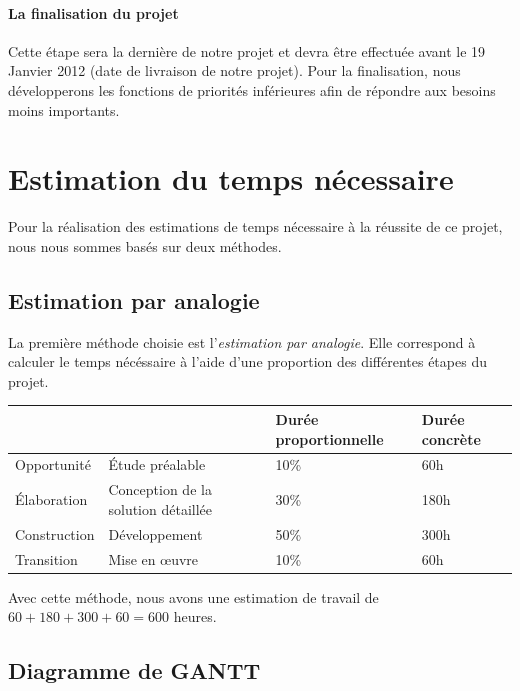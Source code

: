 \paragraph{La finalisation du projet}

Cette étape sera la dernière de notre projet et devra être effectuée avant le 19 Janvier 2012 (date de livraison de notre projet).
Pour la finalisation, nous développerons les fonctions de priorités inférieures afin de répondre aux besoins moins importants. 

\section{Estimation du temps nécessaire}

Pour la réalisation des estimations de temps nécessaire à la réussite de ce projet, nous nous sommes basés sur deux méthodes.

\subsection{Estimation par analogie}

La première méthode choisie est l'\emph{estimation par analogie}.
Elle correspond à calculer le temps nécéssaire à l'aide d'une proportion des différentes étapes du projet.  

\begin{tabular}{|l l|l|l|}
\hline
&& Durée proportionnelle & Durée concrète \\
\hline
Opportunité & Étude préalable & 10\% & 60h \\
\hline
Élaboration & Conception de la solution détaillée & 30\% & 180h \\
\hline
Construction & Développement & 50\% & 300h \\
\hline
Transition & Mise en œuvre & 10\% & 60h \\
\hline
\end{tabular}

Avec cette méthode, nous avons une estimation de travail de $60 + 180 + 300 + 60 = 600$ heures. 

\subsection{Diagramme de GANTT}

